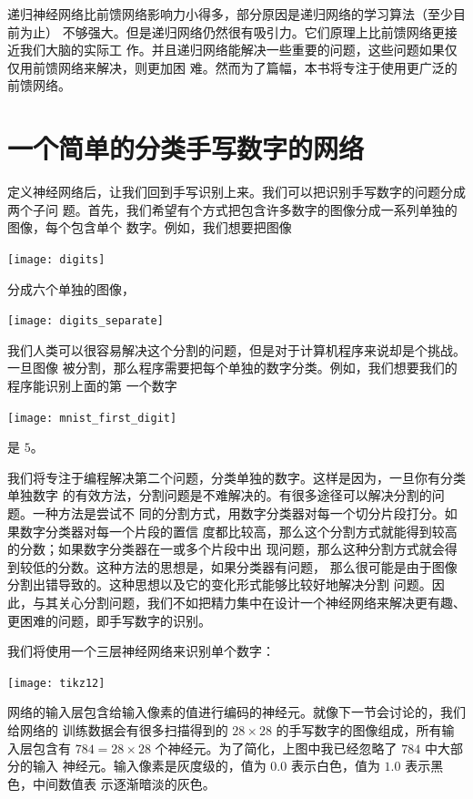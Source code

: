 递归神经网络比前馈网络影响力小得多，部分原因是递归网络的学习算法（至少目前为止）
不够强大。但是递归网络仍然很有吸引力。它们原理上比前馈网络更接近我们大脑的实际工
作。并且递归网络能解决一些重要的问题，这些问题如果仅仅用前馈网络来解决，则更加困
难。然而为了篇幅，本书将专注于使用更广泛的前馈网络。

\section{一个简单的分类手写数字的网络}

定义神经网络后，让我们回到手写识别上来。我们可以把识别手写数字的问题分成两个子问
题。首先，我们希望有个方式把包含许多数字的图像分成一系列单独的图像，每个包含单个
数字。例如，我们想要把图像
\begin{center}
  \texttt{[image: digits]}
\end{center}
分成六个单独的图像，
\begin{center}
  \texttt{[image: digits\_separate]}
\end{center}

我们人类可以很容易解决这个分割的问题，但是对于计算机程序来说却是个挑战。一旦图像
被分割，那么程序需要把每个单独的数字分类。例如，我们想要我们的程序能识别上面的第
一个数字
\begin{center}
  \texttt{[image: mnist\_first\_digit]}
\end{center}
是 $5$。

我们将专注于编程解决第二个问题，分类单独的数字。这样是因为，一旦你有分类单独数字
的有效方法，分割问题是不难解决的。有很多途径可以解决分割的问题。一种方法是尝试不
同的分割方式，用数字分类器对每一个切分片段打分。如果数字分类器对每一个片段的置信
度都比较高，那么这个分割方式就能得到较高的分数；如果数字分类器在一或多个片段中出
现问题，那么这种分割方式就会得到较低的分数。这种方法的思想是，如果分类器有问题，
那么很可能是由于图像分割出错导致的。这种思想以及它的变化形式能够比较好地解决分割
问题。因此，与其关心分割问题，我们不如把精力集中在设计一个神经网络来解决更有趣、
更困难的问题，即手写数字的识别。

我们将使用一个三层神经网络来识别单个数字：
\begin{center}
  \texttt{[image: tikz12]}
\end{center}

网络的输入层包含给输入像素的值进行编码的神经元。就像下一节会讨论的，我们给网络的
训练数据会有很多扫描得到的 $28 \times 28$ 的手写数字的图像组成，所有输入层包含有
$784 = 28 \times 28$ 个神经元。为了简化，上图中我已经忽略了 $784$ 中大部分的输入
神经元。输入像素是灰度级的，值为 $0.0$ 表示白色，值为 $1.0$ 表示黑色，中间数值表
示逐渐暗淡的灰色。

